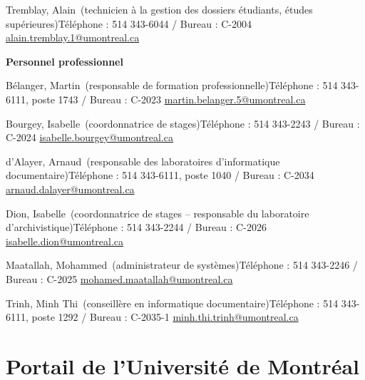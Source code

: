 \documentclass [12 pt]{article}
\begin{document}
            Tremblay, Alain (technicien à la gestion des dossiers
                étudiants, études supérieures)Téléphone : 514 343-6044 / Bureau : C-2004
        \href{
        mailto:alain.tremblay.1@umontreal.ca
        } {
        alain.tremblay.1@umontreal.ca
        }
    
            
        \textbf{
        Personnel
                professionnel
        }
    
            Bélanger, Martin (responsable de formation
                professionnelle)Téléphone : 514 343-6111, poste 1743 / Bureau : C-2023
        \href{
        mailto:martin.belanger.5@umontreal.ca
        } {
        martin.belanger.5@umontreal.ca
        }
    
            Bourgey, Isabelle (coordonnatrice de stages)Téléphone :
                514 343-2243 / Bureau : C-2024
        \href{
        mailto:isabelle.bourgey@umontreal.ca
        } {
        isabelle.bourgey@umontreal.ca
        }
    
            d'Alayer, Arnaud (responsable des laboratoires d'informatique
                documentaire)Téléphone : 514 343-6111, poste 1040 / Bureau : C-2034
        \href{
        mailto:arnaud.dalayer@umontreal.ca
        } {
        arnaud.dalayer@umontreal.ca
        }
    
            Dion, Isabelle (coordonnatrice de stages – responsable du
                laboratoire d'archivistique)Téléphone : 514 343-2244 / Bureau : C-2026
        \href{
        mailto:isabelle.dion@umontreal.ca
        } {
        isabelle.dion@umontreal.ca
        }
    
            Maatallah, Mohammed (administrateur de systèmes)Téléphone
                : 514 343-2246 / Bureau : C-2025
        \href{
        mailto:mohamed.maatallah@umontreal.ca
        } {
        mohamed.maatallah@umontreal.ca
        }
    
            Trinh, Minh Thi (conseillère en informatique
                documentaire)Téléphone : 514 343-6111, poste 1292 / Bureau : C-2035-1
        \href{
        mailto:minh.thi.trinh@umontreal.ca
        } {
        minh.thi.trinh@umontreal.ca
        }
    
        
    
    
        \newpage
        \section {
        Portail de l'Université de Montréal
        }
        
\end{document}
